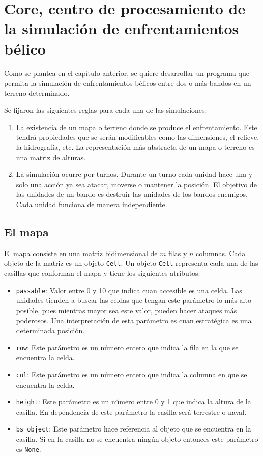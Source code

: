 \section{Core, centro de procesamiento de la simulación de enfrentamientos bélico}

Como se plantea en el capítulo anterior, se quiere desarrollar un programa que permita la simulación de enfrentamientos bélicos entre dos o más bandos en un terreno determinado.

Se fijaron las siguientes reglas para cada una de las simulaciones:

\begin{enumerate}
	\item La existencia de un mapa o terreno donde se produce el enfrentamiento. Este tendrá propiedades que se serán modificables como las dimensiones, el relieve, la hidrografía, etc. La representación más abstracta de un mapa o terreno es una matriz de alturas.
	
	\item La simulación ocurre por turnos. Durante un turno cada unidad hace una y solo una acción ya sea atacar, moverse o mantener la posición. El objetivo de las unidades de un bando es destruir las unidades de los bandos enemigos. Cada unidad funciona de manera independiente. 
\end{enumerate}

\subsection{El mapa}

El mapa consiste en una matriz bidimensional de $m$ filas y $n$ columnas. Cada objeto de la matriz es un objeto \verb|Cell|. Un objeto \verb|Cell| representa cada una de las casillas que conforman el mapa y tiene los siguientes atributos:

\begin{itemize}
	\item \verb|passable|: Valor entre 0 y 10 que indica cuan accesible es una celda. Las unidades tienden a buscar las celdas que tengan este parámetro lo más alto posible, pues mientras mayor sea este valor, pueden hacer ataques más poderosos. Una interpretaci\'on de esta par\'ametro es cuan estrat\'egica es una determinada posici\'on.
	\item \verb|row|: Este parámetro es un número entero que indica la fila en la que se encuentra la celda.
	\item \verb|col|: Este parámetro es un número entero que indica la columna en que se encuentra la celda.
	\item \verb|height|: Este parámetro es un número entre 0 y 1 que indica la altura de la casilla. En dependencia de este parámetro la casilla será terrestre o naval.
	\item \verb|bs_object|: Este parámetro hace referencia al objeto que se encuentra en la casilla. Si en la casilla no se encuentra ningún objeto entonces este parámetro es \verb|None|.
\end{itemize}

